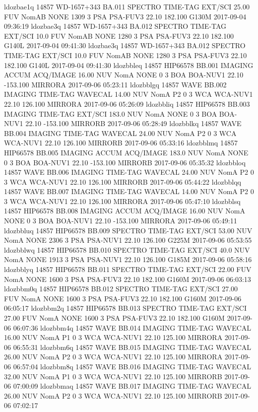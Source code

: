 ldozbae1q 14857 WD-1657+343 BA.011 SPECTRO TIME-TAG EXT/SCI 25.00 FUV NomAB NONE 1309 3 PSA PSA-FUV3 22.10 182.100 G130M 2017-09-04 09:36:19
ldozbae3q 14857 WD-1657+343 BA.012 SPECTRO TIME-TAG EXT/SCI 10.0 FUV NomAB NONE 1280 3 PSA PSA-FUV3 22.10 182.100 G140L 2017-09-04 09:41:30
ldozbae3q 14857 WD-1657+343 BA.012 SPECTRO TIME-TAG EXT/SCI 10.0 FUV NomAB NONE 1280 3 PSA PSA-FUV3 22.10 182.100 G140L 2017-09-04 09:41:30
ldozbbleq 14857 HIP66578 BB.001 IMAGING ACCUM ACQ/IMAGE 16.00 NUV NomA NONE 0 3 BOA BOA-NUV1 22.10 -153.100 MIRRORA 2017-09-06 05:23:11
ldozbblgq 14857 WAVE BB.002 IMAGING TIME-TAG WAVECAL 14.00 NUV NomA P2 0 3 WCA WCA-NUV1 22.10 126.100 MIRRORA 2017-09-06 05:26:09
ldozbbliq 14857 HIP66578 BB.003 IMAGING TIME-TAG EXT/SCI 183.0 NUV NomA NONE 0 3 BOA BOA-NUV1 22.10 -153.100 MIRRORB 2017-09-06 05:28:49
ldozbblkq 14857 WAVE BB.004 IMAGING TIME-TAG WAVECAL 24.00 NUV NomA P2 0 3 WCA WCA-NUV1 22.10 126.100 MIRRORB 2017-09-06 05:33:16
ldozbblmq 14857 HIP66578 BB.005 IMAGING ACCUM ACQ/IMAGE 183.0 NUV NomA NONE 0 3 BOA BOA-NUV1 22.10 -153.100 MIRRORB 2017-09-06 05:35:32
ldozbbloq 14857 WAVE BB.006 IMAGING TIME-TAG WAVECAL 24.00 NUV NomA P2 0 3 WCA WCA-NUV1 22.10 126.100 MIRRORB 2017-09-06 05:44:22
ldozbblqq 14857 WAVE BB.007 IMAGING TIME-TAG WAVECAL 14.00 NUV NomA P2 0 3 WCA WCA-NUV1 22.10 126.100 MIRRORA 2017-09-06 05:47:10
ldozbblsq 14857 HIP66578 BB.008 IMAGING ACCUM ACQ/IMAGE 16.00 NUV NomA NONE 0 3 BOA BOA-NUV1 22.10 -153.100 MIRRORA 2017-09-06 05:49:11
ldozbbluq 14857 HIP66578 BB.009 SPECTRO TIME-TAG EXT/SCI 53.00 NUV NomA NONE 2306 3 PSA PSA-NUV1 22.10 126.100 G225M 2017-09-06 05:53:55
ldozbblwq 14857 HIP66578 BB.010 SPECTRO TIME-TAG EXT/SCI 40.0 NUV NomA NONE 1913 3 PSA PSA-NUV1 22.10 126.100 G185M 2017-09-06 05:58:16
ldozbblyq 14857 HIP66578 BB.011 SPECTRO TIME-TAG EXT/SCI 22.00 FUV NomA NONE 1600 3 PSA PSA-FUV3 22.10 182.100 G160M 2017-09-06 06:03:13
ldozbbm0q 14857 HIP66578 BB.012 SPECTRO TIME-TAG EXT/SCI 27.00 FUV NomA NONE 1600 3 PSA PSA-FUV3 22.10 182.100 G160M 2017-09-06 06:05:17
ldozbbm2q 14857 HIP66578 BB.013 SPECTRO TIME-TAG EXT/SCI 27.00 FUV NomA NONE 1600 3 PSA PSA-FUV3 22.10 182.100 G160M 2017-09-06 06:07:36
ldozbbm4q 14857 WAVE BB.014 IMAGING TIME-TAG WAVECAL 16.00 NUV NomA P1 0 3 WCA WCA-NUV1 22.10 125.100 MIRRORA 2017-09-06 06:55:31
ldozbbm6q 14857 WAVE BB.015 IMAGING TIME-TAG WAVECAL 26.00 NUV NomA P2 0 3 WCA WCA-NUV1 22.10 125.100 MIRRORA 2017-09-06 06:57:04
ldozbbm8q 14857 WAVE BB.016 IMAGING TIME-TAG WAVECAL 32.00 NUV NomA P1 0 3 WCA WCA-NUV1 22.10 125.100 MIRRORB 2017-09-06 07:00:09
ldozbbmaq 14857 WAVE BB.017 IMAGING TIME-TAG WAVECAL 26.00 NUV NomA P2 0 3 WCA WCA-NUV1 22.10 125.100 MIRRORB 2017-09-06 07:02:17

